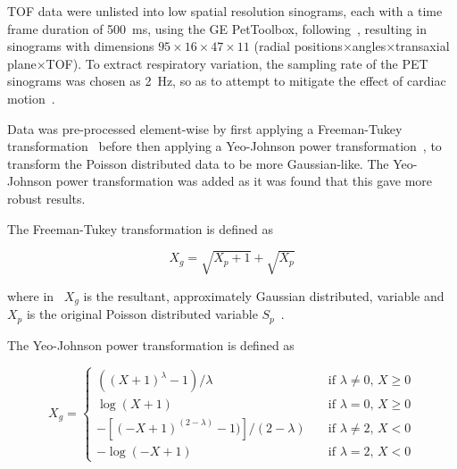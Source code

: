                 \gls{TOF} data were unlisted into low spatial resolution sinograms, each with a time frame duration of \SI{500}{\milli\second}, using the \gls{GE} PetToolbox, following~\parencite{Bertolli2017DataData}, resulting in sinograms with dimensions $95\times16\times47\times11$ (radial positions$\times$angles$\times$transaxial plane$\times$\gls{TOF}). To extract respiratory variation, the sampling rate of the \gls{PET} sinograms was chosen as \SI{2}{\hertz}, so as to attempt to mitigate the effect of cardiac motion~\parencite{Bertolli2018Data-DrivenTomography}.
                
                Data was pre-processed element-wise by first applying a Freeman-Tukey transformation~\parencite{Freeman1950TransformationsRoot} before then applying a Yeo-Johnson power transformation~\parencite{Yeo2000ASymmetry}, to transform the Poisson distributed data to be more Gaussian-like. The Yeo-Johnson power transformation was added as it was found that this gave more robust results.
                
                The Freeman-Tukey transformation is defined as
                
                \begin{equation} \label{eq:pca_data_driven_surrogate_signal_extraction_methods_for_dynamic_pet_evaluation_data_preparation_freeman_tukey}
                    X_g = \sqrt{X_p + 1} + \sqrt{X_p}
                \end{equation}
                
                \noindent where in~ $X_g$ is the resultant, approximately Gaussian distributed, variable and $X_p$ is the original Poisson distributed variable $S_p$~\parencite{Freeman1950TransformationsRoot}.
                
                The Yeo-Johnson power transformation is defined as
                
                \begin{equation} \label{eq:pca_data_driven_surrogate_signal_extraction_methods_for_dynamic_pet_evaluation_data_preparation_yeo_johnson}
                    X_g =   \begin{cases}
                                ((X + 1)^\lambda - 1) / \lambda                     & \quad \text{if } \lambda \neq 0 \text{, } X \geq 0 \\
                                \log(X + 1)                                         & \quad \text{if } \lambda = 0 \text{, } X \geq 0    \\
                                -[(-X + 1)^{(2 - \lambda)} - 1)] / (2 - \lambda)    & \quad \text{if } \lambda \neq 2 \text{, } X < 0    \\
                                -\log(-X + 1)                                       & \quad \text{if } \lambda = 2 \text{, } X < 0
                            \end{cases}
                \end{equation}
                
